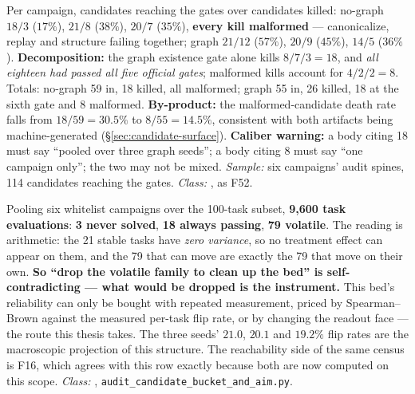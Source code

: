 \begin{description}[leftmargin=0pt,style=nextline,font=\normalfont,itemsep=6pt]
\item[\textbf{F53}\quad Gate rejection ledger, five official gates against
      the sixth.]
Per campaign, candidates reaching the gates over candidates killed:
no-graph $18/3$ ($17\%$), $21/8$ ($38\%$), $20/7$ ($35\%$), \textbf{every
kill malformed} --- canonicalize, replay and structure failing together;
graph $21/12$ ($57\%$), $20/9$ ($45\%$), $14/5$ ($36\%$).
\textbf{Decomposition:} the graph existence gate alone kills $8/7/3 = 18$,
and \emph{all eighteen had passed all five official gates}; malformed kills
account for $4/2/2 = 8$. Totals: no-graph 59 in, 18 killed, all malformed;
graph 55 in, 26 killed, 18 at the sixth gate and 8 malformed.
\textbf{By-product:} the malformed-candidate death rate falls from
$18/59 = 30.5\%$ to $8/55 = 14.5\%$, consistent with both artifacts being
machine-generated (\S\ref{sec:candidate-surface}).
\textbf{Caliber warning:} a body citing 18 must say ``pooled over three
graph seeds''; a body citing 8 must say ``one campaign only''; the two may
not be mixed. \emph{Sample:} six campaigns' audit spines, 114 candidates
reaching the gates. \emph{Class:} , as F52.

\item[\textbf{F54}\quad Task-class census --- this bed has no subset that
      is both informative and reliable.]
Pooling six whitelist campaigns over the 100-task subset,
\textbf{9{,}600 task evaluations}: \textbf{3 never solved}, \textbf{18
always passing}, \textbf{79 volatile}. The reading is arithmetic: the 21
stable tasks have \emph{zero variance}, so no treatment effect can appear
on them, and the 79 that can move are exactly the 79 that move on their
own. \textbf{So ``drop the volatile family to clean up the bed'' is
self-contradicting --- what would be dropped is the instrument.} This bed's
reliability can only be bought with repeated measurement, priced by
Spearman--Brown against the measured per-task flip rate, or by changing the
readout face --- the route this thesis takes. The three seeds' $21.0$,
$20.1$ and $19.2\%$ flip rates are the macroscopic projection of this
structure. The reachability side of the same census is F16, which agrees
with this row exactly because both are now computed on this scope. \emph{Class:} ,
\texttt{audit\_candidate\_bucket\_and\_aim.py}.


\end{description}
